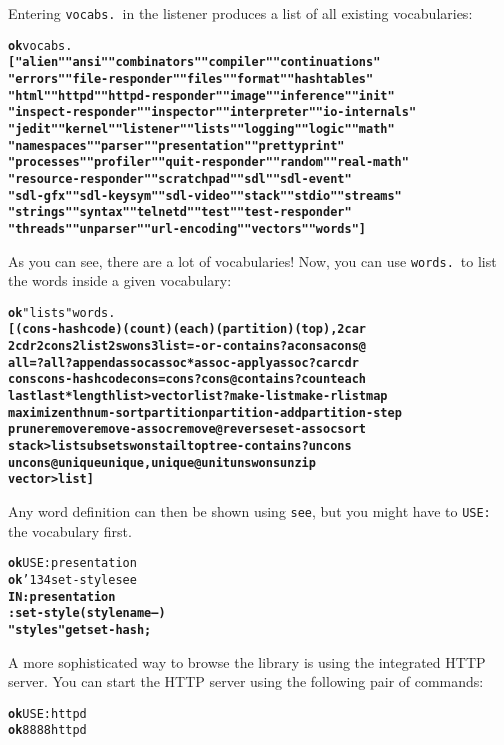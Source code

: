 \documentclass[english]{book}
\newcommand{\ttbackslash}{\char'134}
\begin{document}
Entering \texttt{vocabs.}~in the listener produces a list of all existing vocabularies:

\begin{alltt}
\textbf{ok} vocabs.
\textbf{[ "alien" "ansi" "combinators" "compiler" "continuations"
"errors" "file-responder" "files" "format" "hashtables"
"html" "httpd" "httpd-responder" "image" "inference" "init"
"inspect-responder" "inspector" "interpreter" "io-internals"
"jedit" "kernel" "listener" "lists" "logging" "logic" "math"
"namespaces" "parser" "presentation" "prettyprint"
"processes" "profiler" "quit-responder" "random" "real-math"
"resource-responder" "scratchpad" "sdl" "sdl-event"
"sdl-gfx" "sdl-keysym" "sdl-video" "stack" "stdio" "streams"
"strings" "syntax" "telnetd" "test" "test-responder"
"threads" "unparser" "url-encoding" "vectors" "words" ]
}
\end{alltt}

As you can see, there are a lot of vocabularies! Now, you can use \texttt{words.}~to list the words inside a given vocabulary:

\begin{alltt}
\textbf{ok} "lists" words.
\textbf{[ (cons-hashcode) (count) (each) (partition) (top) , 2car
2cdr 2cons 2list 2swons 3list =-or-contains? acons acons@
all=? all? append assoc assoc* assoc-apply assoc? car cdr
cons cons-hashcode cons= cons? cons@ contains? count each
last last* length list>vector list? make-list make-rlist map
maximize nth num-sort partition partition-add partition-step
prune remove remove-assoc remove@ reverse set-assoc sort
stack>list subset swons tail top tree-contains? uncons
uncons@ unique unique, unique@ unit unswons unzip
vector>list ]}
\end{alltt}

Any word definition can then be shown using \texttt{see}, but you might have to \texttt{USE:} the vocabulary first.

\begin{alltt}
\textbf{ok} USE: presentation
\textbf{ok} \ttbackslash set-style see
\textbf{IN: presentation
: set-style ( style name -- )
    "styles" get set-hash ;}
\end{alltt}

A more sophisticated way to browse the library is using the integrated HTTP server. You can start the HTTP server using the following pair of commands:

\begin{alltt}
\textbf{ok} USE: httpd
\textbf{ok} 8888 httpd
\end{alltt}
\end{document}

